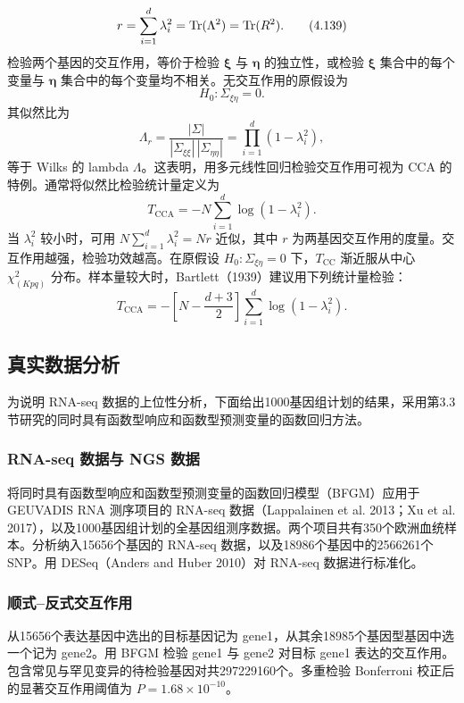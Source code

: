 \begin{equation}
r=\sum_{i=1}^{d}\lambda_i^2=\operatorname{Tr}(\Lambda^2)=\operatorname{Tr}(R^2).
\tag{4.139}
\end{equation}
检验两个基因的交互作用，等价于检验 $\boldsymbol\xi$ 与 $\boldsymbol\eta$ 的独立性，或检验 $\boldsymbol\xi$ 集合中的每个变量与 $\boldsymbol\eta$ 集合中的每个变量均不相关。无交互作用的原假设为
\[
H_0:\Sigma_{\xi\eta}=0.
\]
其似然比为
\begin{equation}
\Lambda_r=\frac{|\Sigma|}{|\Sigma_{\xi\xi}|\,|\Sigma_{\eta\eta}|}
=\prod_{i=1}^{d}(1-\lambda_i^2),
\tag{4.140}
\end{equation}
等于 Wilks 的 lambda $\Lambda$。这表明，用多元线性回归检验交互作用可视为 CCA 的特例。通常将似然比检验统计量定义为
\begin{equation}
T_{\mathrm{CCA}}=-N\sum_{i=1}^{d}\log(1-\lambda_i^2).
\tag{4.141}
\end{equation}
当 $\lambda_i^2$ 较小时，可用 $N\sum_{i=1}^{d}\lambda_i^2=Nr$ 近似，其中 $r$ 为两基因交互作用的度量。交互作用越强，检验功效越高。在原假设 $H_0:\Sigma_{\xi\eta}=0$ 下，$T_{\mathrm{CC}}$ 渐近服从中心 $\chi^2_{(Kpq)}$ 分布。样本量较大时，Bartlett（1939）建议用下列统计量检验：
\begin{equation}
T_{\mathrm{CCA}}=-\left[N-\frac{d+3}{2}\right]
\sum_{i=1}^{d}\log(1-\lambda_i^2).
\tag{4.142}
\end{equation}

\subsection{真实数据分析}
为说明 RNA-seq 数据的上位性分析，下面给出1000基因组计划的结果，采用第3.3节研究的同时具有函数型响应和函数型预测变量的函数回归方法。

\subsubsection{RNA-seq 数据与 NGS 数据}
将同时具有函数型响应和函数型预测变量的函数回归模型（BFGM）应用于 GEUVADIS RNA 测序项目的 RNA-seq 数据（Lappalainen et al. 2013；Xu et al. 2017），以及1000基因组计划的全基因组测序数据。两个项目共有350个欧洲血统样本。分析纳入15656个基因的 RNA-seq 数据，以及18986个基因中的2566261个 SNP。用 DESeq（Anders and Huber 2010）对 RNA-seq 数据进行标准化。

\subsubsection{顺式–反式交互作用}
从15656个表达基因中选出的目标基因记为 gene1，从其余18985个基因型基因中选一个记为 gene2。用 BFGM 检验 gene1 与 gene2 对目标 gene1 表达的交互作用。包含常见与罕见变异的待检验基因对共297229160个。多重检验 Bonferroni 校正后的显著交互作用阈值为 $P=1.68\times10^{-10}$。

